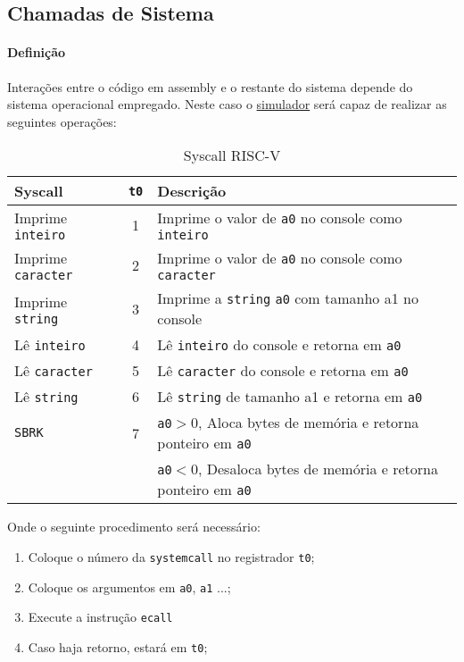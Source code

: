 \documentclass{article}
\begin{document}
        \subsection{Chamadas de Sistema}
            \paragraph{Definição}Interações entre o código em assembly e o restante do sistema depende do sistema operacional empregado. Neste caso o \href{https://ascslab.org/research/briscv/simulator/simulator.html#}{simulador} será capaz de realizar as seguintes operações:
                \begin{table}[H]
                    \centering
                    \begin{tabular}[]{l|c l}\hline
                        Syscall         & \texttt{t0} & Descrição\\\hline
                        Imprime \texttt{inteiro}  & 1 & Imprime o valor de \texttt{a0} no console como \texttt{inteiro}\\
                        Imprime \texttt{caracter} & 2 & Imprime o valor de \texttt{a0} no console como \texttt{caracter}\\
                        Imprime \texttt{string}   & 3 & Imprime a \texttt{string} \texttt{a0} com tamanho a1 no console\\
                        Lê \texttt{inteiro}       & 4 & Lê \texttt{inteiro} do console e retorna em \texttt{a0}\\
                        Lê \texttt{caracter}      & 5 & Lê \texttt{caracter} do console e retorna em \texttt{a0}\\
                        Lê \texttt{string}        & 6 & Lê \texttt{string} de tamanho a1 e retorna em \texttt{a0}\\
                        \texttt{SBRK}             & 7 & \texttt{a0}$>$0, Aloca bytes de memória e retorna ponteiro em \texttt{a0}\\
                                                  &   & \texttt{a0}$<$0, Desaloca bytes de memória e retorna ponteiro em \texttt{a0}\\\hline
                    \end{tabular}
                    \caption{Syscall RISC-V}
                \end{table}\noindent
            Onde o seguinte procedimento será necessário:
                \begin{enumerate}[rightmargin = \leftmargin, noitemsep]
                    \item Coloque o número da \texttt{systemcall} no registrador \texttt{t0};
                    \item Coloque os argumentos em \texttt{a0}, \texttt{a1} ...;
                    \item Execute a instrução \texttt{ecall}
                    \item Caso haja retorno, estará em \texttt{t0};
                \end{enumerate}
\newpage
\end{document}
